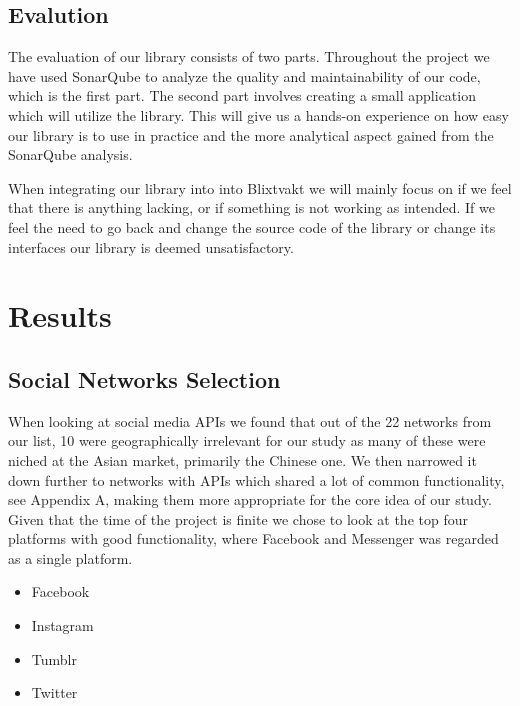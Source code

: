 \documentclass{sigchi-alternate}
\begin{document}
\subsection{Evalution}
The evaluation of our library consists of two parts. Throughout the project we have used SonarQube to analyze the quality and maintainability of our code, which is the first part. The second part
involves creating a small application which will utilize the library. This will give us a hands-on experience on how easy our library is to use in practice and the more analytical aspect gained
from the SonarQube analysis. 

When integrating our library into into Blixtvakt we will mainly focus on if we feel that there is anything lacking, or if something is not working as intended. If we feel the need to go back and
change the source code of the library or change its interfaces our library is deemed unsatisfactory. 

\section{Results}
\subsection{Social Networks Selection}
When looking at social media APIs we found that out of the 22 networks from our list\autocite{STATISTA_LEADING_SOCIAL_NETWORKS}, 10 were geographically irrelevant for our study as many of these were
niched at the Asian market, primarily the Chinese one. We then narrowed it down further to networks with APIs which shared a lot of common functionality, see Appendix A, making them more appropriate for the core idea
of our study. Given that the time of the project is finite we chose to look at the top four platforms with good functionality, where Facebook and Messenger was regarded as a single platform.
\begin{itemize}
	\item Facebook
	\item Instagram
	\item Tumblr
	\item Twitter
\end{itemize}
\end{document}
